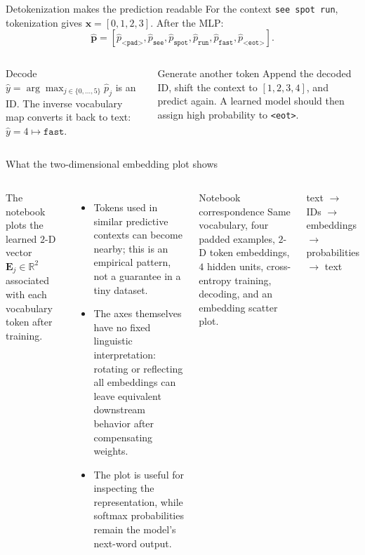 \documentclass[aspectratio=169]{beamer}
\newcommand{\E}{\mathbf{E}}
\newcommand{\x}{\mathbf{x}}
\begin{document}
\begin{frame}{Detokenization makes the prediction readable}
\small
For the context \texttt{see spot run}, tokenization gives $\x=[0,1,2,3]$. After the MLP:
\[
\hat{\mathbf p}=\left[\hat p_{\texttt{<pad>}},\hat p_{\texttt{see}},\hat p_{\texttt{spot}},\hat p_{\texttt{run}},\hat p_{\texttt{fast}},\hat p_{\texttt{<eot>}}\right].
\]
\begin{columns}[T]
\begin{block}{Decode}
$\hat y=\arg\max_{j\in\{0,\ldots,5\}}\hat p_j$ is an ID. The inverse vocabulary map converts it back to text: $\hat y=4\mapsto\texttt{fast}$.
\end{block}
\begin{block}{Generate another token}
Append the decoded ID, shift the context to $[1,2,3,4]$, and predict again. A learned model should then assign high probability to \texttt{<eot>}.
\end{block}
\centering
{}
\end{columns}
\end{frame}

\begin{frame}{What the two-dimensional embedding plot shows}
\small
\begin{columns}[T]
The notebook plots the learned $2$-D vector $\E_j\in\mathbb R^2$ associated with each vocabulary token after training.
\begin{itemize}
\item Tokens used in similar predictive contexts can become nearby; this is an empirical pattern, not a guarantee in a tiny dataset.
\item The axes themselves have no fixed linguistic interpretation: rotating or reflecting all embeddings can leave equivalent downstream behavior after compensating weights.
\item The plot is useful for inspecting the representation, while softmax probabilities remain the model's next-word output.
\end{itemize}
\begin{block}{Notebook correspondence}
Same vocabulary, four padded examples, $2$-D token embeddings, $4$ hidden units, cross-entropy training, decoding, and an embedding scatter plot.
\end{block}
\vspace{1em}
\centering\Large text $\rightarrow$ IDs $\rightarrow$ embeddings $\rightarrow$ probabilities $\rightarrow$ text
\end{columns}
\end{frame}
\end{document}

